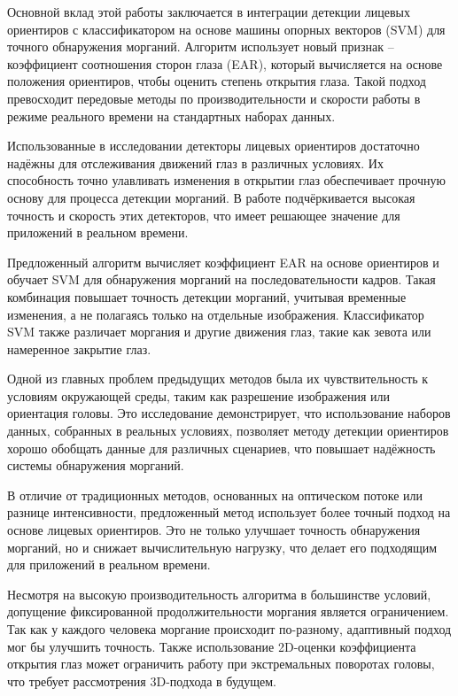 Основной вклад этой работы заключается в интеграции детекции лицевых
ориентиров с классификатором на основе машины опорных векторов (SVM) для
точного обнаружения морганий. Алгоритм использует новый признак --
коэффициент соотношения сторон глаза (EAR), который вычисляется на
основе положения ориентиров, чтобы оценить степень открытия глаза. Такой
подход превосходит передовые методы по производительности и скорости
работы в режиме реального времени на стандартных наборах данных.

Использованные в исследовании детекторы лицевых ориентиров достаточно
надёжны для отслеживания движений глаз в различных условиях. Их
способность точно улавливать изменения в открытии глаз обеспечивает
прочную основу для процесса детекции морганий. В работе подчёркивается
высокая точность и скорость этих детекторов, что имеет решающее значение
для приложений в реальном времени.

Предложенный алгоритм вычисляет коэффициент EAR на основе ориентиров и
обучает SVM для обнаружения морганий на последовательности кадров. Такая
комбинация повышает точность детекции морганий, учитывая временные
изменения, а не полагаясь только на отдельные изображения. Классификатор
SVM также различает моргания и другие движения глаз, такие как зевота
или намеренное закрытие глаз.

Одной из главных проблем предыдущих методов была их чувствительность к
условиям окружающей среды, таким как разрешение изображения или
ориентация головы. Это исследование демонстрирует, что использование
наборов данных, собранных в реальных условиях, позволяет методу детекции
ориентиров хорошо обобщать данные для различных сценариев, что повышает
надёжность системы обнаружения морганий.

В отличие от традиционных методов, основанных на оптическом потоке или
разнице интенсивности, предложенный метод использует более точный подход
на основе лицевых ориентиров. Это не только улучшает точность
обнаружения морганий, но и снижает вычислительную нагрузку, что делает
его подходящим для приложений в реальном времени.

Несмотря на высокую производительность алгоритма в большинстве условий,
допущение фиксированной продолжительности моргания является
ограничением. Так как у каждого человека моргание происходит по-разному,
адаптивный подход мог бы улучшить точность. Также использование
2D-оценки коэффициента открытия глаз может ограничить работу при
экстремальных поворотах головы, что требует рассмотрения 3D-подхода в
будущем.

